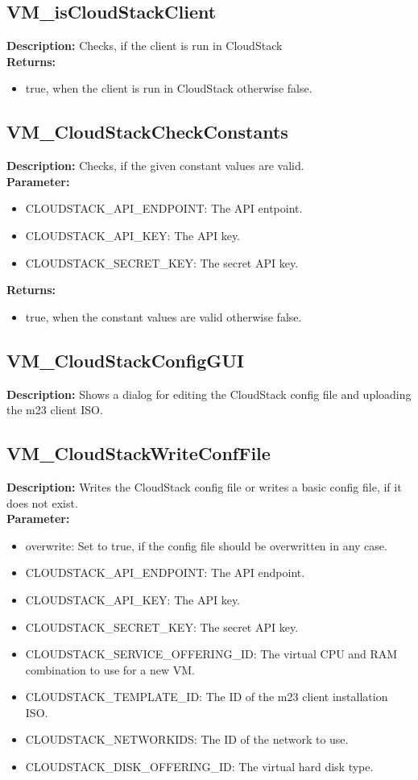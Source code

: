 \subsection{VM\_isCloudStackClient}
\textbf{Description:} Checks, if the client is run in CloudStack\\
\textbf{Returns:}
\begin{itemize}
\item true, when the client is run in CloudStack otherwise false.
\end{itemize}

\subsection{VM\_CloudStackCheckConstants}
\textbf{Description:} Checks, if the given constant values are valid.\\
\textbf{Parameter:}
\begin{itemize}
\item CLOUDSTACK\_API\_ENDPOINT: The API entpoint.
\item CLOUDSTACK\_API\_KEY: The API key.
\item CLOUDSTACK\_SECRET\_KEY: The secret API key.
\end{itemize}
\textbf{Returns:}
\begin{itemize}
\item true, when the constant values are valid otherwise false.
\end{itemize}

\subsection{VM\_CloudStackConfigGUI}
\textbf{Description:} Shows a dialog for editing the CloudStack config file and uploading the m23 client ISO.\\

\subsection{VM\_CloudStackWriteConfFile}
\textbf{Description:} Writes the CloudStack config file or writes a basic config file, if it does not exist.\\
\textbf{Parameter:}
\begin{itemize}
\item overwrite: Set to true, if the config file should be overwritten in any case.
\item CLOUDSTACK\_API\_ENDPOINT: The API endpoint.
\item CLOUDSTACK\_API\_KEY: The API key.
\item CLOUDSTACK\_SECRET\_KEY: The secret API key.
\item CLOUDSTACK\_SERVICE\_OFFERING\_ID: The virtual CPU and RAM combination to use for a new VM.
\item CLOUDSTACK\_TEMPLATE\_ID: The ID of the m23 client installation ISO.
\item CLOUDSTACK\_NETWORKIDS: The ID of the network to use.
\item CLOUDSTACK\_DISK\_OFFERING\_ID: The virtual hard disk type.
\end{itemize}

